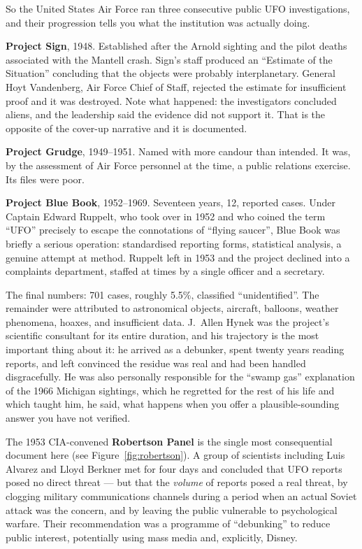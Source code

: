 So the United States Air Force ran three consecutive public UFO investigations, and their
progression tells you what the institution was actually doing.

\textbf{Project Sign}, 1948. Established after the Arnold sighting and the pilot deaths
associated with the Mantell crash. Sign's staff produced an ``Estimate of the Situation''
concluding that the objects were probably interplanetary. General Hoyt Vandenberg, Air Force
Chief of Staff, rejected the estimate for insufficient proof and it was destroyed. Note what
happened: the investigators concluded aliens, and the leadership said the evidence did not
support it. That is the opposite of the cover-up narrative and it is documented.

\textbf{Project Grudge}, 1949--1951. Named with more candour than intended.  It was, by the assessment of Air Force personnel at the time, a public relations
exercise. Its files were poor.

\textbf{Project Blue Book}, 1952--1969. Seventeen years, 12, reported cases. Under Captain
Edward Ruppelt, who took over in 1952 and who coined the term ``UFO'' precisely to escape the
connotations of ``flying saucer'', Blue Book was briefly a serious operation: standardised
reporting forms, statistical analysis, a genuine attempt at method. Ruppelt left in 1953 and
the project declined into a complaints department, staffed at times by a single officer and a
secretary.

The final numbers: 701 cases, roughly 5.5\%, classified ``unidentified''. The remainder were
attributed to astronomical objects, aircraft, balloons, weather phenomena, hoaxes, and
insufficient data. J.~Allen Hynek was the project's scientific consultant for its entire
duration, and his trajectory is the most important thing about it: he arrived as a debunker,
spent twenty years reading reports, and left convinced the residue was real and had been
handled disgracefully. He was also personally responsible for the ``swamp gas'' explanation of
the 1966 Michigan sightings, which he regretted for the rest of his life and which taught him,
he said, what happens when you offer a plausible-sounding answer you have not verified.

The 1953 CIA-convened \textbf{Robertson Panel} is the single most consequential document here (see Figure~\ref{fig:robertson}).
A group of scientists including Luis Alvarez and Lloyd Berkner met for four days and concluded
that UFO reports posed no direct threat --- but that the \emph{volume} of reports posed a real
threat, by clogging military communications channels during a period when an actual Soviet
attack was the concern, and by leaving the public vulnerable to psychological warfare. Their
recommendation was a programme of ``debunking'' to reduce public interest, potentially using
mass media and, explicitly, Disney.

